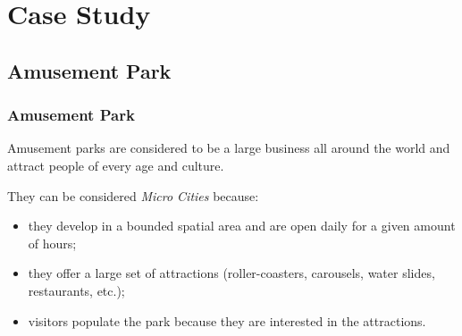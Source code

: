 \section{Case Study}\label{sec:case-study}
\frame{\tableofcontents[currentsection]}

\subsection{Amusement Park}\label{subsec:amusement-park}

\begin{frame}
    \frametitle{Amusement Park}
    Amusement parks are considered to be a large business all around the world and attract people of every age and culture.

    \bigskip

   They can be considered \textit{Micro Cities} because:
    \begin{itemize}
        \item they develop in a bounded spatial area and are open daily for a given amount of hours;
        \item they offer a large set of attractions (roller-coasters, carousels, water slides, restaurants, etc.);
        \item visitors populate the park because they are interested in the attractions.
    \end{itemize}

\end{frame}


